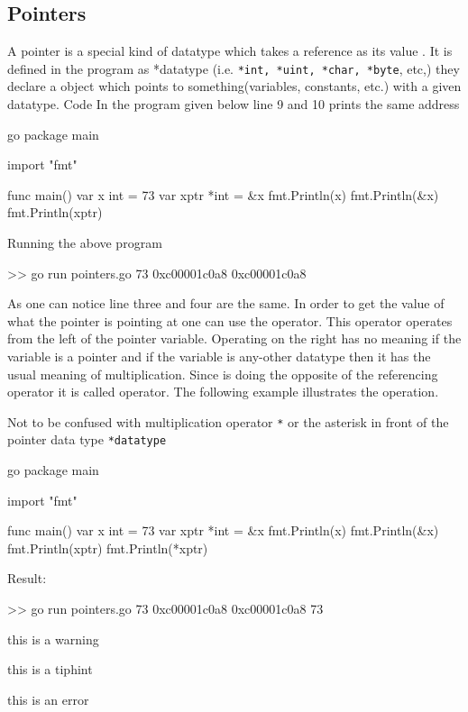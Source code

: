 \documentclass[12pt,a4paper]{report}
\begin{document}
\subsection{Pointers}
A pointer is a special kind of datatype which takes a reference as its value . It is defined in the program as *datatype (i.e. \texttt{*int, *uint, *char, *byte}, etc,) they declare a  object which points to something(variables, constants, etc.) with a given datatype. Code 
In the program given below line 9 and 10 prints the same address
%
\begin{code}{go}
package main

import "fmt"

func main() {
  var x int = 73
  var xptr *int = &x
  fmt.Println(x)
  fmt.Println(&x)
  fmt.Println(xptr)
}
\end{code}
%
Running the above program
\begin{literal}
>> go run pointers.go
73
0xc00001c0a8
0xc00001c0a8
\end{literal}
%
As one can notice line three and four are the same. In order to get the value of what the pointer is pointing at one can use the \pre{*} operator. This operator operates from the left of the pointer variable. Operating on the right has no meaning if the variable is a pointer and if the variable is any-other datatype then it has the usual meaning of multiplication. Since \pre{*} is doing the opposite of the referencing operator \pre{\&} it is called  operator. The following example illustrates the operation.
%
\begin{note}
	Not to be confused with multiplication operator \texttt{*} or the asterisk in front of the pointer data type \texttt{*datatype}
\end{note}
%
\begin{lazycode}[title,label={myCodeLabel},nameref={Code title or whatever}]{go}
package main

import "fmt"

func main() {
  var x int = 73
  var xptr *int = &x
  fmt.Println(x)
  fmt.Println(&x)
  fmt.Println(xptr)
  fmt.Println(*xptr)
}
\end{lazycode}
%
Result:
%
\begin{literal}
>> go run pointers.go
73
0xc00001c0a8
0xc00001c0a8
73
\end{literal}

\begin{warning}this is a warning\end{warning}
\begin{tip}{this is a tiphint}\end{tip}
\begin{error}this is an error\end{error}
\end{document}
